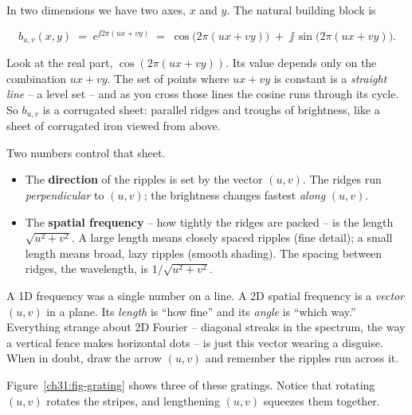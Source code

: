 In two dimensions we have two axes, $x$ and $y$. The natural building block is

\begin{equation}
b_{u,v}(x,y) \;=\; e^{\jj 2\pi (u x + v y)}
\;=\; \cos\!\big(2\pi(ux+vy)\big) \;+\; \jj\,\sin\!\big(2\pi(ux+vy)\big).
\label{ch31:basis}
\end{equation}

Look at the real part, $\cos(2\pi(ux+vy))$. Its value depends only on the
combination $ux+vy$. The set of points where $ux+vy$ is constant is a
\emph{straight line} -- a level set -- and as you cross those lines the cosine runs
through its cycle. So $b_{u,v}$ is a corrugated sheet: parallel ridges and
troughs of brightness, like a sheet of corrugated iron viewed from above.

Two numbers control that sheet.

\begin{itemize}
\item The \textbf{direction} of the ripples is set by the vector
$(u,v)$. The ridges run \emph{perpendicular} to $(u,v)$; the brightness changes
fastest \emph{along} $(u,v)$.
\item The \textbf{spatial frequency} -- how tightly the ridges are packed -- is the
length $\sqrt{u^2+v^2}$. A large length means closely spaced ripples (fine
detail); a small length means broad, lazy ripples (smooth shading). The spacing
between ridges, the wavelength, is $1/\sqrt{u^2+v^2}$.
\end{itemize}

\begin{intuitionbox}
A 1D frequency was a single number on a line. A 2D spatial frequency is a
\emph{vector} $(u,v)$ in a plane. Its \emph{length} is ``how fine'' and its
\emph{angle} is ``which way.'' Everything strange about 2D Fourier -- diagonal
streaks in the spectrum, the way a vertical fence makes horizontal dots -- is just
this vector wearing a disguise. When in doubt, draw the arrow $(u,v)$ and remember
the ripples run across it.
\end{intuitionbox}

Figure~\ref{ch31:fig-grating} shows three of these gratings. Notice that rotating
$(u,v)$ rotates the stripes, and lengthening $(u,v)$ squeezes them together.

